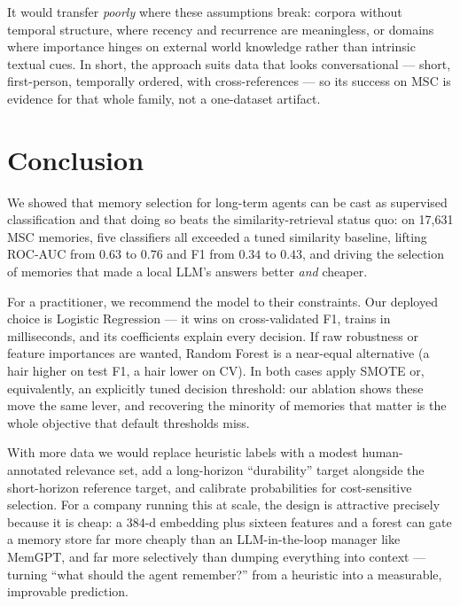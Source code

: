 \documentclass[11pt]{article}
\begin{document}
It would transfer \emph{poorly} where these assumptions break: corpora without
temporal structure, where recency and recurrence are meaningless, or domains where
importance hinges on external world knowledge rather than intrinsic textual cues.
In short, the approach suits data that looks conversational --- short, first-person,
temporally ordered, with cross-references --- so its success on MSC is evidence for
that whole family, not a one-dataset artifact.

\section{Conclusion}
We showed that memory selection for long-term agents can be cast as supervised
classification and that doing so beats the similarity-retrieval status quo: on
17{,}631 MSC memories, five classifiers all exceeded a tuned similarity baseline,
lifting ROC-AUC from $0.63$ to $0.76$ and F1 from $0.34$ to $0.43$, and driving the
selection of memories that made a local LLM's answers better \emph{and} cheaper.

For a practitioner, we recommend the model to their constraints. Our deployed
choice is Logistic Regression --- it wins on cross-validated F1, trains in
milliseconds, and its coefficients explain every decision. If raw robustness or
feature importances are wanted, Random Forest is a near-equal alternative (a hair
higher on test F1, a hair lower on CV). In both cases apply SMOTE or, equivalently,
an explicitly tuned decision threshold: our ablation shows these move the same
lever, and recovering the minority of memories that matter is the whole objective
that default thresholds miss.

With more data we would replace heuristic labels with a modest human-annotated
relevance set, add a long-horizon ``durability'' target alongside the short-horizon
reference target, and calibrate probabilities for cost-sensitive selection. For a
company running this at scale, the design is attractive precisely because it is
cheap: a $384$-d embedding plus sixteen features and a forest can gate a memory
store far more cheaply than an LLM-in-the-loop manager like MemGPT, and far more
selectively than dumping everything into context --- turning ``what should the
agent remember?'' from a heuristic into a measurable, improvable prediction.
\end{document}
